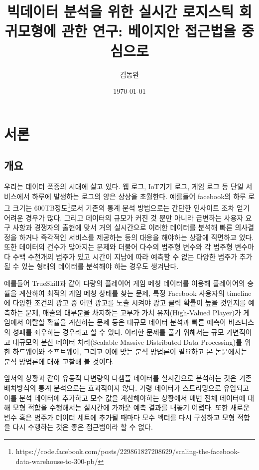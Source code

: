 \documentclass[oneside,b5paper,11pt]{book} %
\title{빅데이터 분석을 위한 실시간 로지스틱 회귀모형에 관한 연구: 베이지안 접근법을 중심으로}
\author{김동완}
\date{\today}
\begin{document}
\maketitle

\tableofcontents

\chapter{서론}

\section{개요}
 우리는 데이터 폭증의 시대에 살고 있다. 웹 로그, IoT기기 로그, 게임 로그 등 단일 서비스에서 하루에 발생하는 로그의 양은 상상을 초월한다. 예를들어 facebook의 하루 로그 크기는 600TB정도\footnote{https://code.facebook.com/posts/229861827208629/scaling-the-facebook-data-warehouse-to-300-pb/}로서 기존의 통계 분석 방법으로는 간단한 인사이트 조차 얻기 어려운 경우가 많다. 그리고 데이터의 규모가 커진 것 뿐만 아니라 급변하는 사용자 요구 사항과 경쟁자의 출현에 맞서 거의 실시간으로 이러한 데이터를 분석해 빠른 의사결정을 하거나 즉각적인 서비스를 제공하는 등의 대응을 해야하는 상황에 직면하고 있다. 또한 데이터의 건수가 많아지는 문제와 더불어 다수의 범주형 변수와 각 범주형 변수마다 수백 수천개의 범주가 있고 시간이 지남에 따라 예측할 수 없는 다양한 범주가 추가될 수 있는 형태의 데이터를 분석해야 하는 경우도 생겨난다.

 예를들어 TrueSkill과 같이 다량의 플레이어 게임 메칭 데이터를 이용해 플레이어의 승률을 계산하여 최적의 게임 메칭 상태를 찾는 문제\citep{Herbrich2006}, 특정 Facebook 사용자의 timeline에 다양한 조건의 광고 중 어떤 광고를 노출 시켜야 광고 클릭 확률이 높을 것인지를 예측하는 문제\citep{He2014}, 매출의 대부분을 차지하는 고부가 가치 유저(High-Valued Player)가 게임에서 이탈할 확률을 계산하는 문제\citep{Runge2014} 등은 대규모 데이터 분석과 빠른 예측이 비즈니스의 성패를 좌우하는 경우라고 할 수 있다. 이러한 문제를 풀기 위해서는 규모 가변적이고 대규모의 분산 데이터 처리(Scalable Massive Distributed Data Processing)를 위한 하드웨어와 소프트웨어, 그리고 이에 맞는 분석 방법론이 필요하고 본 논문에서는 분석 방법론에 대해 고찰해 볼 것이다.
 
 앞서의 상황과 같이 유동적 다변량의 다샘플 데이터를 실시간으로 분석하는 것은 기존 배치방식의 통계 분석으로는 효과적이지 않다. 가령 데이터가 스트리밍으로 유입되고 이를 분석 데이터에 추가하고 모수 값을 계산해야하는 상황에서 매번 전체 데이터에 대해 모형 적합을 수행해서는 실시간에 가까운 예측 결과를 내놓기 어렵다. 또한 새로운 변수 혹은 범주가 데이터 세트에 추가될 때마다 모수 벡터를 다시 구성하고 모형 적합을 다시 수행하는 것은 좋은 접근법이라 할 수 없다. 
\end{document}
